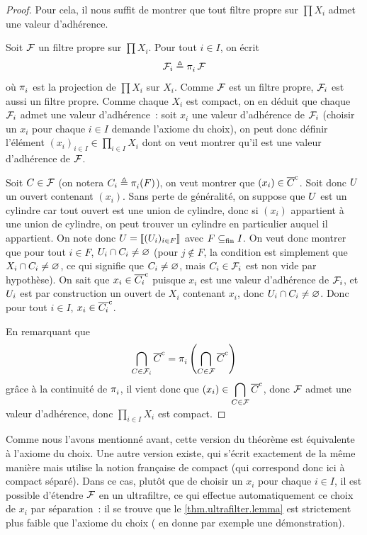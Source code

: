 \begin{proof}
  Pour cela, il nous suffit de montrer que tout filtre propre sur $\prod X_i$
  admet une valeur d'adhérence.

  Soit $\mathcal{F}$ un filtre propre sur $\prod X_i$. Pour tout $i\in I$, on
  écrit
  \[\mathcal{F}_i \triangleq \mathop{\pi_{i}^{}}\mathcal{F}\]
  où $\mathop{\pi_{i}^{}}$ est la projection de $\prod X_i$ sur $X_i$. Comme $\mathcal{F}$ est
  un filtre propre, $\mathcal{F}_i$ est aussi un filtre propre. Comme
  chaque $X_i$ est compact, on en déduit que chaque $\mathcal{F}_i$ admet une
  valeur d'adhérence~: soit $x_i$ une valeur d'adhérence de $\mathcal{F}_i$
  (choisir un $x_i$ pour chaque $i\in I$ demande l'axiome du choix), on
  peut donc définir l'élément
  $\displaystyle (x_i)_{i\in I}\in \prod_{i \in I}X_i$
  dont on veut montrer qu'il est une valeur d'adhérence de $\mathcal{F}$.

  Soit $C\in \mathcal{F}$ (on notera $C_i \triangleq \mathop{\pi_{i}^{}}(F)$), on veut
  montrer que $(x_i)\in \overline{C}^{\mathrm c}$. Soit donc $U$ un ouvert contenant
  $(x_i)$. Sans perte de généralité, on suppose que $U$ est un cylindre car
  tout ouvert est une union de cylindre, donc si $(x_i)$ appartient à une union
  de cylindre, on peut trouver un cylindre en particulier auquel il appartient.
  On note donc $U = \llbracket (U_i)_{i\in F}\rrbracket$ avec $F\subseteq_{\mathrm{fin}} I$. On veut
  donc montrer que pour tout $i\in F$, $U_i\cap C_i\neq\varnothing$
  (pour $j\notin F$, la condition est simplement que
  $X_i \cap C_i\neq\varnothing$, ce qui signifie que $C_i\neq\varnothing$, mais
  $C_i\in\mathcal{F}_i$ est non vide par hypothèse).
  On sait que $x_i \in \overline{C_i}^{\mathrm c}$ puisque $x_i$ est une valeur
  d'adhérence de $\mathcal{F}_i$, et $U_i$ est par construction un ouvert de
  $X_i$ contenant $x_i$, donc $U_i\cap C_i \neq\varnothing$. Donc pour tout
  $i\in I$, $x_i\in \overline{C_i}^{\mathrm c}$.

  En remarquant que
  \[\bigcap_{C \in \mathcal{F}_i}\overline{C}^{\mathrm c} =
  \mathop{\pi_{i}^{}}\left(\bigcap_{C \in \mathcal{F}} \overline{C}^{\mathrm c}\right)\]
  grâce à la continuité de $\mathop{\pi_{i}^{}}$, il vient donc que
  $\displaystyle (x_i) \in \bigcap_{C \in\mathcal{F}}\overline{C}^{\mathrm c}$, donc
  $\mathcal{F}$ admet une valeur d'adhérence, donc
  $\displaystyle\prod_{i\in I} X_i$ est compact.
\end{proof}

\begin{remark}
  Comme nous l'avons mentionné avant, cette version du théorème est équivalente
  à l'axiome du choix. Une autre version existe, qui s'écrit exactement de la
  même manière mais utilise la notion française de compact (qui correspond donc
  ici à compact séparé). Dans ce cas, plutôt que de choisir un $x_i$ pour
  chaque $i \in I$, il est possible d'étendre $\mathcal{F}$ en un ultrafiltre,
  ce qui effectue automatiquement ce choix de $x_i$ par séparation~: il se
  trouve que le \cref{thm.ultrafilter.lemma} est strictement plus faible que
  l'axiome du choix (\cite{Krivine2007} en donne par exemple une
  démonstration).
\end{remark}

